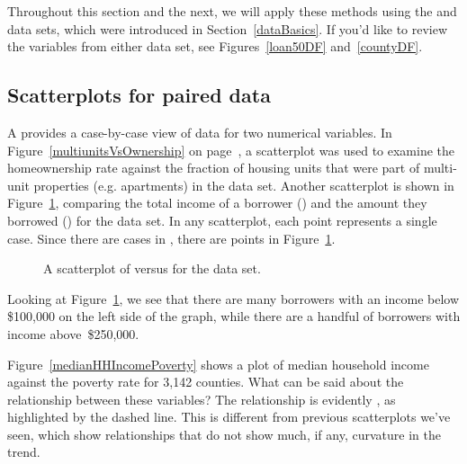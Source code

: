 Throughout this section and the next, we will apply these
methods using the  and  data sets,
which were introduced in Section~\ref{dataBasics}.
If you'd like to review the variables from either data set,
see Figures~\ref{loan50DF} and~\ref{countyDF}.


\subsection{Scatterplots for paired data}
\label{scatterPlots}


A  provides a case-by-case view of data
for two numerical variables.
In Figure~\ref{multiunitsVsOwnership} on
page~\pageref{multiunitsVsOwnership}, a scatterplot
was used to examine the homeownership rate against
the fraction of housing units that were part of
multi-unit properties
(e.g. apartments) in the  data set.
Another scatterplot is shown in Figure~\ref{loan50_amt_vs_income},
comparing the total income of a borrower
() and the amount they borrowed
() for the  data set.
In any scatterplot, each point represents a single case.
Since there are \loanN{} cases in ,
there are \loanN{} points in Figure~\ref{loan50_amt_vs_income}.

\begin{figure}[h]
  \centering
  \caption{A scatterplot of 
      versus  for the
       data set.}
  \label{loan50_amt_vs_income}
\end{figure}

Looking at Figure~\ref{loan50_amt_vs_income},
we see that there are many borrowers with an income below
\$100,000 on the left side of the graph,
while there are a handful of borrowers with income above~\$250,000.

\begin{examplewrap}
\begin{nexample}{Figure~\ref{medianHHIncomePoverty}
    shows a plot of median household income
    against the poverty rate for 3,142 counties.
    What can be said about the relationship between
    these variables?}
  The relationship is evidently ,
  as highlighted by the dashed line.
  This is different from previous scatterplots we've seen,
  which show relationships that do not show much, if any,
  curvature in the trend.
\end{nexample}
\end{examplewrap}

